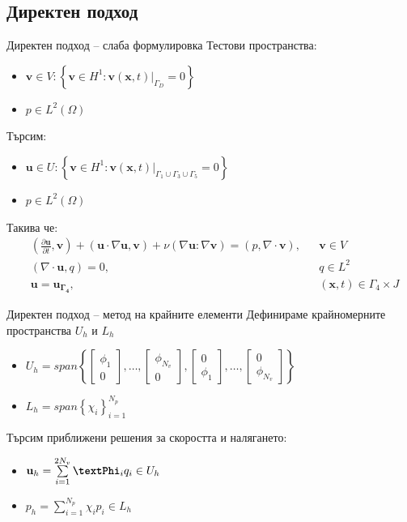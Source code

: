 \documentclass{beamer}
\begin{document}
    \subsection{Директен подход}
    \begin{frame}{Директен подход -- слаба формулировка}
    Тестови пространства:
    \begin{itemize}
    		\item $\mathbf{v} \in V : \left\{\mathbf{v} \in H^1 : \mathbf{v}(\mathbf{x}, t)|_{\Gamma_D} = 0 \right\}$
    		\item $p \in L^2(\Omega)$
    \end{itemize}
    Търсим:
    \begin{itemize}
    		\item $\mathbf{u} \in U : \left\{\mathbf{v} \in H^1 : \mathbf{v}(\mathbf{x}, t)|_{\Gamma_1 \cup \Gamma_3 \cup \Gamma_5} = 0\right\}$
    		\item $p \in L^2(\Omega)$
    \end{itemize}
    Такива че:
\begin{align*}
  &\left(\frac{\partial\mathbf{u}}{\partial t}, \mathbf{v}\right)
  + (\mathbf{u}\cdot\nabla\mathbf{u}, \mathbf{v}) + \nu(\nabla\mathbf{u} : \nabla\mathbf{v}) =
  (p, \nabla \cdot \mathbf{v}), &&\mathbf{v} \in V \\
  &(\nabla\cdot\mathbf{u}, q) = 0, &&q \in L^2 \\
  &\mathbf{u} = \mathbf{u_{\Gamma_4}}, &&\left(\mathbf{x}, t\right) \in \Gamma_4 \times J  
\end{align*}
    \end{frame}
    \begin{frame}{Директен подход -- метод на крайните елементи}
    		Дефинираме крайномерните пространства $U_h$ и $L_h$
		\begin{itemize}
			\item $U_h = span\left\{
								\begin{bmatrix} \phi_1 \\ 0\end{bmatrix}
								, \dots ,
								\begin{bmatrix} \phi_{N_v} \\ 0\end{bmatrix} ,
								\begin{bmatrix} 0 \\ \phi_1\end{bmatrix}
								, \dots ,
								\begin{bmatrix} 0 \\ \phi_{N_v}\end{bmatrix}
						\right\}$
  			\item $L_h = span\left\{\chi_i\right\}^{N_p}_{i = 1}$
		\end{itemize}
    		Търсим приближени решения за скоростта и налягането:
    		\begin{itemize}
    			\item $\mathbf{u}_h = \sum\limits_{i=1}^{2N_v}{\textbf{\textPhi}_iq_i} \in U_h$
    			\item $p_h = \sum\limits_{i=1}^{N_p}{\chi_ip_i} \in L_h$
		\end{itemize}
    \end{frame}
\end{document}

